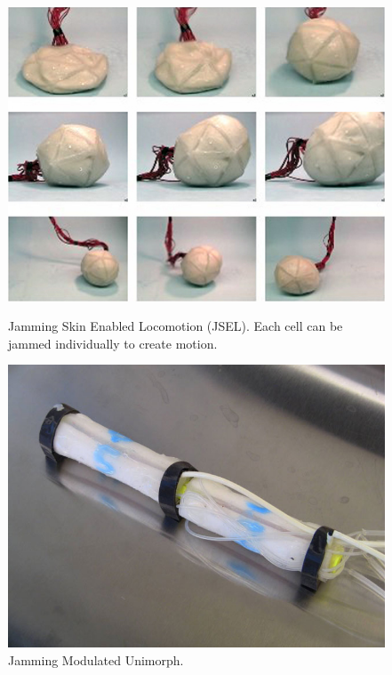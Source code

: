 \begin{figure}
  \centering
  \begin{minipage}[t]{.45\textwidth}
    \centering
    \includegraphics[width=.9\linewidth]{figures/jamming/chembot-robot-blob}
    \caption[Jamming Skin Enabled Locomotion (JSEL) by \citet{steltz2009jsel}.]
    {Jamming Skin Enabled Locomotion (JSEL). Each cell can be jammed individually to create motion.}
    \label{fig:ch:jamming:jsel}
    \hspace{.2\textwidth} 
  \end{minipage}%
  \hspace{0.5cm}
  \begin{minipage}[t]{.45\textwidth}
    \centering
    \includegraphics[width=.9\linewidth]{figures/jamming/jmu-worm}
    \caption[Jamming Modulated Unimorph by \citet{steltz2010jamming}.]
    {Jamming Modulated Unimorph.}
    \label{fig:ch:jamming:jmu}
  \end{minipage}
\end{figure}

